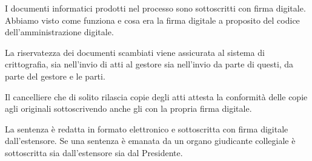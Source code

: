 I documenti informatici prodotti nel processo sono sottoscritti con firma digitale. Abbiamo visto come funziona e cosa era la firma digitale a proposito del codice dell'amministrazione digitale. 

La riservatezza dei documenti scambiati viene assicurata al sistema di crittografia, sia nell'invio di atti al gestore sia nell'invio da parte di questi, da parte del gestore e le parti. 

Il cancelliere che di solito rilascia copie degli atti attesta la conformità delle copie agli originali sottoscrivendo anche gli con la propria firma digitale. 

La sentenza è redatta in formato elettronico e sottoscritta con firma digitale dall'estensore. Se una sentenza è emanata da un organo giudicante collegiale è sottoscritta sia dall'estensore sia dal Presidente.
